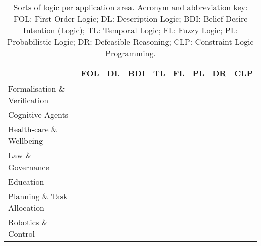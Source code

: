 
\newcommand{\y}{\checkmark}

\begin{table}
    \centering
    \begin{tabular}{l||c|c|c|c|c|c|c|c}
        \hline
        & FOL & DL & BDI & TL & FL & PL & DR & CLP \\ \hline
        \hline
        Formalisation \& Verification &    &    &    & \y &    & \y &    &    \\ \hline
        Cognitive Agents              & \y & \y & \y & \y & \y &    & \y &    \\ \hline
        Health-care \& Wellbeing      & \y & \y &    &    &    & \y &    &    \\ \hline
        Law \& Governance             & \y &    &    &    &    &    & \y &    \\ \hline
        Education                     & \y & \y &    &    & \y &    &    &    \\ \hline
        Planning \& Task Allocation   & \y & \y &    &    &    &    & \y & \y \\ \hline
        Robotics \& Control           &    & \y &    & \y & \y &    &    & \y \\ \hline
    \end{tabular}
    \caption{Sorts of logic per application area. Acronym and abbreviation key: FOL: First-Order Logic; DL: Description Logic; BDI: Belief Desire Intention (Logic); TL: Temporal Logic; FL: Fuzzy Logic; PL: Probabilistic Logic; DR: Defeasible Reasoning; CLP: Constraint Logic Programming.}
    \label{tab:logic-usages}
\end{table}

